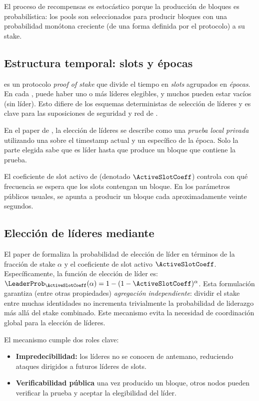 El proceso de recompensas es estocástico porque la producción de bloques es probabilística: los pools son seleccionados para producir bloques con una probabilidad monótona creciente (de una forma definida por el protocolo) a su stake.

\subsection{Estructura temporal: slots y épocas}
\Praos \cite{cryptoeprint:2017/573} es un protocolo \textit{proof of stake} que divide el tiempo en \emph{slots} agrupados en \emph{épocas}. En cada \Slot, puede haber uno o más líderes elegibles, y muchos \Slot pueden estar vacíos (sin líder). Esto difiere de los esquemas deterministas de selección de líderes y es clave para las suposiciones de seguridad y red de \Praos.

En el paper de \Praos, la elección de líderes se describe como una \emph{prueba local privada} utilizando una \VRF sobre el timestamp actual y un \Nonce específico de la época. Solo la parte elegida sabe que es líder hasta que produce un bloque que contiene la prueba.

El coeficiente de slot activo de \Cardano (denotado $\ActiveSlotCoeff$) controla con qué frecuencia se espera que los slots contengan un bloque. En los parámetros públicos usuales, se apunta a producir un bloque cada aproximadamente veinte segundos.

\subsection{Elección de líderes mediante \VRF}
El paper de \Praos formaliza la probabilidad de elección de líder en términos de la fracción de stake $\alpha$ y el coeficiente de slot activo $\ActiveSlotCoeff$. Específicamente, la función de elección de líder es: $\LeaderProb_{\ActiveSlotCoeff}(\alpha) = 1 - (1 - \ActiveSlotCoeff)^{\alpha}$. Esta formulación garantiza (entre otras propiedades) \emph{agregación independiente}: dividir el stake entre muchas identidades no incrementa trivialmente la probabilidad de liderazgo más allá del stake combinado. Este mecanismo evita la necesidad de coordinación global para la elección de líderes.

El mecanismo \VRF cumple dos roles clave:

\begin{itemize}[noitemsep]
	\item \textbf{Impredecibilidad:} los líderes no se conocen de antemano, reduciendo ataques dirigidos a futuros líderes de slots.
	\item \textbf{Verificabilidad pública} una vez producido un bloque, otros nodos pueden verificar la prueba \VRF y aceptar la elegibilidad del líder.
\end{itemize}

